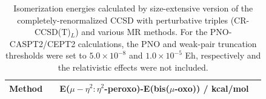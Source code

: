 \documentclass[aip,jcp,amsmath]{revtex4-1}
\begin{document}
{
\begin{longtable}[!ht]{cccc}
  \caption{\label{tab:isomerizationenergies}
    Isomerization energies calculated by size-extensive version of the completely-renormalized CCSD with perturbative triples (CR-CCSD(T)${}_L$) and various MR methods. For the PNO-CASPT2/CEPT2 calculations, the PNO and weak-pair truncation thresholds were set to $5.0\times 10^{-8}$ and $1.0\times 10^{-5}$ Eh, respectively and the relativistic effects were not included.
}
\\
\hline
\hline
Method                                          && E($\mu-\eta^2:\eta^2$-peroxo)-E(bis($\mu$-oxo)) / kcal/mol \\
\hline


\end{longtable}}
\end{document}
